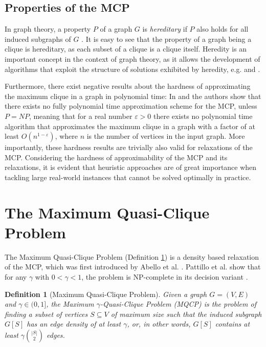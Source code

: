 \documentclass[draft,final]{vutinfth} %
\newtheorem{definition}{Definition}[section]
\begin{document}
\subsection{Properties of the MCP}

In graph theory, a property $P$ of a graph $G$ is \textit{hereditary} if $P$ also holds for all induced subgraphs of $G$ \cite{pattillo_maximum_2013}. It is easy to see that the property of a graph being a clique is hereditary, as each subset of a clique is a clique itself. Heredity is an important concept in the context of graph theory, as it allows the development of algorithms that exploit the structure of solutions exhibited by heredity, e.g. \cite{Trukhanov2013} and \cite{GSCHWIND2018131}.  

Furthermore, there exist negative results about the hardness of approximating the maximum clique in a graph in polynomial time: In \cite{Hastad1999} and \cite{Zuckerman2007} the authors show that there exists no fully polynomial time approximation scheme for the MCP, unless $\mathit{P} = \mathit{NP}$, meaning that for a real number $\varepsilon > 0$ there exists no polynomial time algorithm that approximates the maximum clique in a graph with a factor of at least $O(n^{1-\varepsilon})$, where $n$ is the number of vertices in the input graph. More importantly, these hardness results are trivially also valid for relaxations of the MCP. Considering the hardness of approximability of the MCP and its relaxations, it is evident that heuristic approaches are of great importance when tackling large real-world instances that cannot be solved optimally in practice. 

\section{The Maximum Quasi-Clique Problem}\label{sec:mqcp}

The Maximum Quasi-Clique Problem (Definition \ref{def:mqcp}) is a density based relaxation of the MCP, which was first introduced by Abello et al. \cite{Abello2002}. Pattillo et al. show that for any $\gamma$ with $0 < \gamma < 1$, the problem is NP-complete in its decision variant \cite{pattillo_maximum_2013}. 

\begin{definition}[Maximum Quasi-Clique Problem]
	\label{def:mqcp}
	Given a graph $G = (V,E)$ and $\gamma \in (0,1]$, the Maximum $\gamma$-Quasi-Clique Problem (MQCP) is the problem of finding a subset of vertices $S \subseteq V$ of maximum size 
	such that the induced subgraph $G[S]$ has an edge density of at least $\gamma$, or, in other words, $G[S]$ contains at least $\gamma \binom{|S|}{2}$ edges. 
\end{definition}
\end{document}
